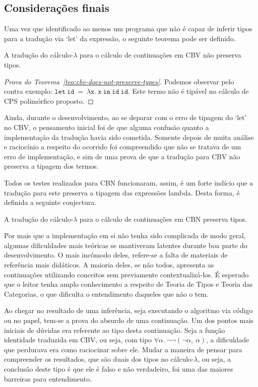 \subsection{Considerações finais}
Uma vez que identificado ao menos um programa que não é capaz de inferir tipos para a tradução via `let' da expressão, o seguinte teorema pode ser definido.
\begin{teorema}\label{teo:cbv-does-not-preserve-types}
  A tradução do cálculo-$\lambda$ para o cálculo de continuações em CBV não preserva tipos.
\end{teorema}

\begin{proof}[Prova do Teorema~\ref{teo:cbv-does-not-preserve-types}]
  Podemos observar pelo contra exemplo: $\mathtt{let\ id\ =\ \lambda x.\ x\ in\ id\ id}$.
  Este termo não é tipável no cálculo de CPS polimórfico proposto.
  \qedhere
\end{proof}
\noindent Ainda, durante o desenvolvimento, ao se deparar com o erro de tipagem do `let' no CBV, o pensamento inicial foi de que alguma confusão quanto a implementação da tradução havia sido cometida.
Somente depois de muita análise e raciocínio a respeito do ocorrido foi compreendido que não se tratava de um erro de implementação, e sim de uma prova de que a tradução para CBV não preserva a tipagem dos termos.

Todos os testes realizados para CBN funcionaram, assim, é um forte indício que a tradução para este preserva a tipagem das expressões lambda.
Desta forma, é definida a seguinte conjectura.
\begin{conjectura}\label{conj:cbn-preserve-types}
  A tradução do cálculo-$\lambda$ para o cálculo de continuações em CBN preserva tipos.
\end{conjectura}

Por mais que a implementação em si não tenha sido complicada de modo geral, algumas dificuldades mais teóricas se mantiveram latentes durante boa parte do desenvolvimento.
O mais incômodo deles, refere-se a falta de materiais de referência mais didáticos.
A maioria deles, se não todos, apresenta as continuações utilizando conceitos sem previamente contextualizá-los.
É esperado que o leitor tenha amplo conhecimento a respeito de Teoria de Tipos e Teoria das Categorias, o que dificulta o entendimento daqueles que não o tem.

Ao chegar no resultado de uma inferência, seja executando o algoritmo via código ou no papel, tem-se a prova do absurdo de uma continuação.
Um dos pontos mais iniciais de dúvidas era referente ao tipo desta continuação.
Seja a função identidade traduzida em CBV, ou seja, com tipo $\forall\alpha.\ \neg\neg(\neg\alpha,\ \alpha)$, a dificuldade que perdurava era como raciocinar sobre ele.
Mudar a maneira de pensar para compreender os resultados, que são duais dos tipos no cálculo-$\lambda$, ou seja, a conclusão deste tipo é que ele é falso e não verdadeiro, foi uma das maiores barreiras para entendimento.
